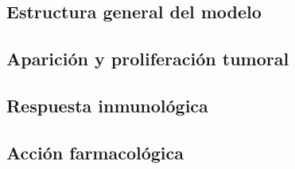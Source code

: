 \subsection{Estructura general del modelo}

\subsection{Aparición y proliferación tumoral}
\subsection{Respuesta inmunológica}
\subsection{Acción farmacológica}